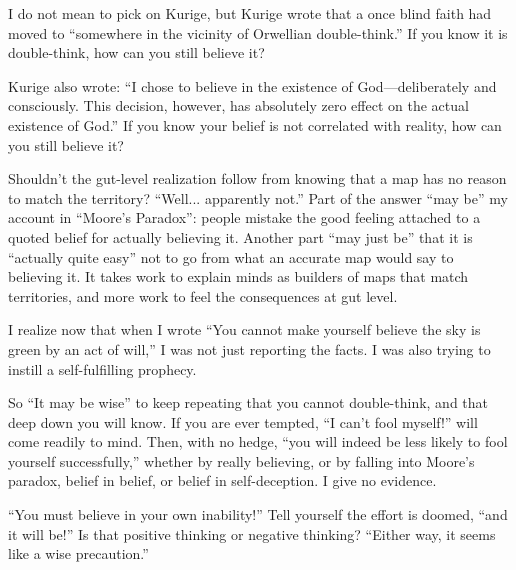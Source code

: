
I do not mean to pick on Kurige, but Kurige wrote that a once blind faith had moved to ``somewhere in the vicinity of Orwellian double-think.'' If you know it is double-think, how can you still believe it? 

Kurige also wrote: ``I chose to believe in the existence of God—deliberately and consciously. This decision, however, has absolutely zero effect on the actual existence of God.'' If you know your belief is not correlated with reality, how can you still believe it? 

Shouldn't the gut-level realization follow from knowing that a map has no reason to match the territory? ``Well... apparently not.'' Part of the answer ``may be'' my account in ``Moore's Paradox'': people mistake the good feeling attached to a quoted belief for actually believing it. Another part ``may just be'' that it is ``actually quite easy'' not to go from what an accurate map would say to believing it. It takes work to explain minds as builders of maps that match territories, and more work to feel the consequences at gut level.

I realize now that when I wrote ``You cannot make yourself believe the sky is green by an act of will,'' I was not just reporting the facts. I was also trying to instill a self-fulfilling prophecy. 

So ``It may be wise'' to keep repeating that you cannot double-think, and that deep down you will know. If you are ever tempted, ``I can't fool myself!'' will come readily to mind. Then, with no hedge, ``you will indeed be less likely to fool yourself successfully,'' whether by really believing, or by falling into Moore's paradox, belief in belief, or belief in self-deception. I give no evidence. 

``You must believe in your own inability!'' Tell yourself the effort is doomed, ``and it will be!'' Is that positive thinking or negative thinking? ``Either way, it seems like a wise precaution.''
